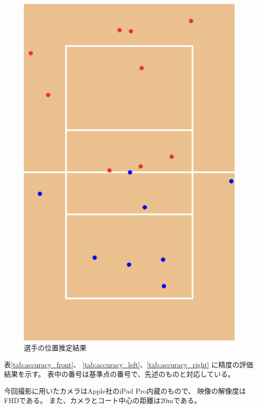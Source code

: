 \documentclass[twoside,twocolumn]{jsarticle}
\begin{document}
    \begin{figure}[h]
        \centering
        \includegraphics[width=0.4\hsize]{estimated.png}
        \caption{選手の位置推定結果}
        \label{fig:estimation}
    \end{figure}

    表\ref{tab:accuracy_front}、
    \ref{tab:accuracy_left}、\ref{tab:accuracy_right}
    に精度の評価結果を示す。
    表中の番号は基準点の番号で、先述のものと対応している。

    今回撮影に用いたカメラはApple社のiPad Pro内蔵のもので、
    映像の解像度はFHDである。
    また、カメラとコート中心の距離は20mである。
\end{document}
